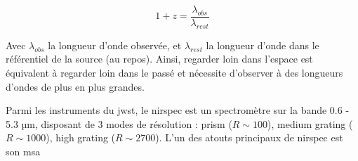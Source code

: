 \documentclass[11pt, a4paper, twocolumn]{article}
\begin{document}
\begin{equation}
    1 + z = \frac{\lambda_{obs}}{\lambda_{rest}}
\end{equation}

Avec $\lambda_{obs}$ la longueur d'onde observée, et $\lambda_{rest}$ la longueur d'onde dans le référentiel de la source (au repos). Ainsi, regarder loin dans l'espace est équivalent à regarder loin dans le passé et nécessite d'observer à des longueurs d'ondes de plus en plus grandes.

Parmi les instruments du \gls{jwst}, le \gls{nirspec} est un spectromètre sur la bande 0.6 - 5.3  µm, disposant de 3 modes de résolution : prism ($R \sim 100$), medium grating ($R \sim 1000$), high grating ($R \sim 2700$). L'un des atouts principaux de \gls{nirspec} est son \gls{msa}







\printnoidxglossaries

\printbibliography %
\end{document}

